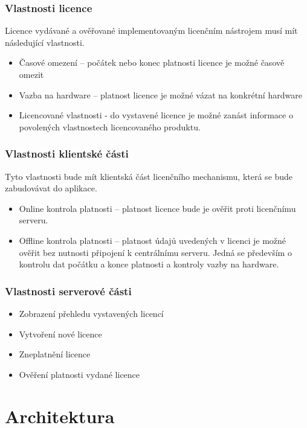 \subsubsection*{Vlastnosti licence}

Licence vydávané a ověřované implementovaným licenčním nástrojem musí mít
následující vlastnosti.

\begin{itemize}
  \item Časové omezení – počátek nebo konec platnosti licence je možné časově
  omezit
  \item Vazba na hardware – platnost licence je možné vázat na konkrétní
  hardware
  \item Licencované vlastnosti - do vystavené licence je možné zanást
  informace o povolených vlastnostech licencovaného produktu.
\end{itemize}

\subsubsection*{Vlastnosti klientské části}

Tyto vlastnosti bude mít klientská část licenčního mechanismu, která se bude
zabudovávat do aplikace.

\begin{itemize}
  \item Online kontrola platnosti – platnost licence bude je ověřit proti
  licenčnímu serveru.
  \item Offline kontrola platnosti – platnost údajů uvedených v licenci je
  možné ověřit bez nutnosti připojení k centrálnímu serveru. Jedná se především
  o kontrolu dat počátku a konce platnosti a kontroly vazby na hardware.
\end{itemize}

\subsubsection*{Vlastnosti serverové části}

\begin{itemize}
  \item Zobrazení přehledu vystavených licencí
  \item Vytvoření nové licence
  \item Zneplatnění licence
  \item Ověření platnosti vydané licence
\end{itemize}

\section{Architektura}

